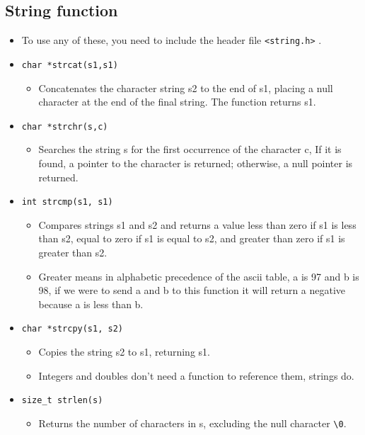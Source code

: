 \subsection{String function}
\begin{itemize}
    \item To use any of these, you need to include the header file \verb|<string.h>| .
        
    \item \texttt{char *strcat(s1,s1)}
        \begin{itemize}
            \item Concatenates the character string s2 to the end of s1, placing a null character at the end of the final string. The function returns s1.
        \end{itemize}
    
    \item \texttt{char *strchr(s,c)}
        \begin{itemize}
            \item Searches the string s for the first occurrence of the character c, If it is found, a pointer to the character is returned; otherwise, a null pointer is returned.
        \end{itemize}
    
    \item \texttt{int strcmp(s1, s1)}
        \begin{itemize}
            \item Compares strings s1 and s2 and returns a value less than zero if s1 is less than s2, equal to zero if s1 is equal to s2, and greater than zero if s1 is greater than s2.
            \item Greater means in alphabetic precedence of the ascii table, a is 97 and b is 98, if we were to send a and b to this function it will return a negative because a is less than b.
        \end{itemize}
    
    \item \texttt{char *strcpy(s1, s2)}
        \begin{itemize}
            \item Copies the string s2 to s1, returning s1.
            \item Integers and doubles don't need a function to reference them, strings do. 
        \end{itemize}
    
    \item \texttt{size_t strlen(s)}
        \begin{itemize}
            \item Returns the number of characters in s, excluding the null character \verb|\0|.
        \end{itemize}
    

\end{itemize}
